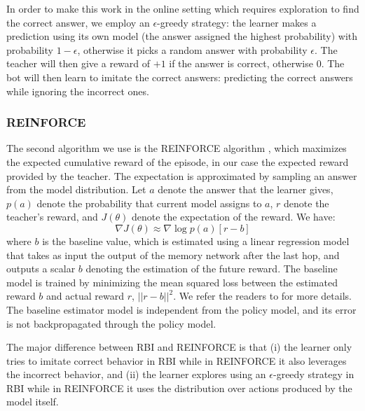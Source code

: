 In order to make this work in the online setting which requires exploration to find the correct answer,
we employ an $\epsilon$-greedy strategy:
the learner makes a prediction using its own model (the answer assigned the highest probability)
 with probability $1-\epsilon$, otherwise it picks a random answer with probability $\epsilon$.
The teacher will then give a reward of $+1$ if the answer is correct, otherwise $0$.
The bot will then learn to imitate the correct answers:
predicting the correct answers while ignoring the incorrect ones.


\subsubsection{REINFORCE}
The second algorithm we use is the REINFORCE algorithm \citep{williams1992simple},
which maximizes the expected cumulative reward of the episode, in our case the expected reward provided by the teacher.
The expectation is approximated by sampling an answer from the model distribution.
Let $a$ denote the answer that the learner gives,
$p(a)$ denote the probability that current model assigns to $a$,
$r$ denote the teacher's reward, and $J(\theta)$ denote the expectation of the reward. We have:
\begin{equation}
\nabla J(\theta)\approx\nabla\log p(a) [r-b]
\end{equation}
where $b$ is the baseline value, which is estimated using a linear regression model
that takes as input the output of the memory network after the last hop,
and outputs a scalar $b$ denoting the estimation of the future reward.
The baseline model is trained by minimizing the mean squared loss between the estimated reward $b$ and actual reward $r$, $||r-b||^2$.
We refer the readers to  for more details.
The baseline estimator model is independent from the policy model, and its error is not backpropagated through the policy model.

The major difference between RBI and REINFORCE is that (i) the learner only tries to imitate correct behavior in RBI while in REINFORCE it also leverages the incorrect behavior,
and (ii) the learner explores using an $\epsilon$-greedy strategy in RBI while in REINFORCE it uses the distribution over actions produced by the model itself.


